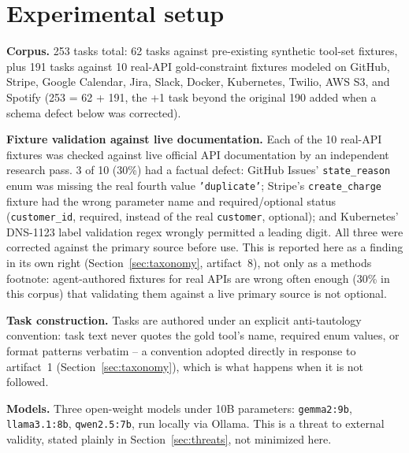 \documentclass[11pt]{article}
\begin{document}
\section{Experimental setup}
\label{sec:corpus}

\textbf{Corpus.} 253 tasks total: 62 tasks against pre-existing synthetic tool-set fixtures, plus
191 tasks against 10 real-API gold-constraint fixtures modeled on GitHub, Stripe, Google Calendar,
Jira, Slack, Docker, Kubernetes, Twilio, AWS S3, and Spotify %
(253 = 62 + 191, the +1 task beyond the original 190 added when a schema defect below was
corrected). %

\textbf{Fixture validation against live documentation.} Each of the 10 real-API fixtures was
checked against live official API documentation by an independent research pass. 3 of 10 (30\%)
had a factual defect: GitHub Issues' \texttt{state\_reason} enum was missing the real fourth value
\texttt{'duplicate'}; Stripe's \texttt{create\_charge} fixture had the wrong parameter name and
required/optional status (\texttt{customer\_id}, required, instead of the real \texttt{customer},
optional); and Kubernetes' DNS-1123 label validation regex wrongly permitted a leading digit. All
three were corrected against the primary source before use.
This is reported here as a finding in its own right (Section~\ref{sec:taxonomy}, artifact~8), not
only as a methods footnote: agent-authored fixtures for real APIs are wrong often enough (30\% in
this corpus) that validating them against a live primary source is not optional.

\textbf{Task construction.} Tasks are authored under an explicit anti-tautology convention: task
text never quotes the gold tool's name, required enum values, or format patterns verbatim -- a
convention adopted directly in response to artifact~1 (Section~\ref{sec:taxonomy}), which is what
happens when it is not followed. %

\textbf{Models.} Three open-weight models under 10B parameters: \texttt{gemma2:9b},
\texttt{llama3.1:8b}, \texttt{qwen2.5:7b}, run locally via Ollama.
This is a threat to external validity, stated plainly in Section~\ref{sec:threats}, not minimized
here.
\end{document}

